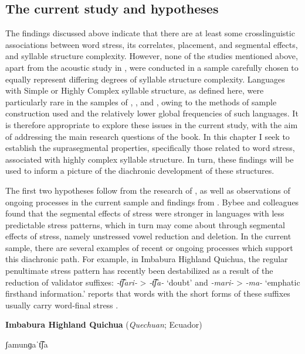\subsection{The current study and hypotheses}\label{sec:5.1.3}

  The findings discussed above indicate that there are at least some crosslinguistic associations between word stress, its correlates, placement, and segmental effects, and syllable structure complexity. However, none of the studies mentioned above, apart from the acoustic study in \citet{EasterdayEtAl2011}, were conducted in a sample carefully chosen to equally represent differing degrees of syllable structure complexity. Languages with Simple or Highly Complex syllable structure, as defined here, were particularly rare in the samples of \citet{Auer1993}, \citet{BybeeEtAl1998}, and \citet{Schiering2007}, owing to the methods of sample construction used and the relatively lower global frequencies of such languages. It is therefore appropriate to explore these issues in the current study, with the aim of addressing the main research questions of the book. In this chapter I seek to establish the suprasegmental properties, specifically those related to word stress, associated with highly complex syllable structure. In turn, these findings will be used to inform a picture of the diachronic development of these structures.

  The first two hypotheses follow from the research of \citet{BybeeEtAl1998}, as well as observations of ongoing processes in the current sample and findings from . Bybee and colleagues found that the segmental effects of stress were stronger in languages with less predictable stress patterns, which in turn may come about through segmental effects of stress, namely unstressed vowel reduction and deletion. In the current sample, there are several examples of recent or ongoing processes which support this diachronic path. For example, in Imbabura Highland Quichua, the regular penultimate stress pattern has recently been destabilized as a result of the reduction of validator suffixes: \textit{-t͡ʃari-} > \textit{-t͡ʃa-} ‘doubt’ and \textit{-mari-} > \textit{-ma-} ‘emphatic firsthand information.’ \citet{Cole1982} reports that words with the short forms of these suffixes usually carry word-final stress .

\ea\label{ex:5.1}
  \textbf{Imbabura Highland Quichua} (\textit{Quechuan}; Ecuador)

ʃamunɡaˈt͡ʃa

